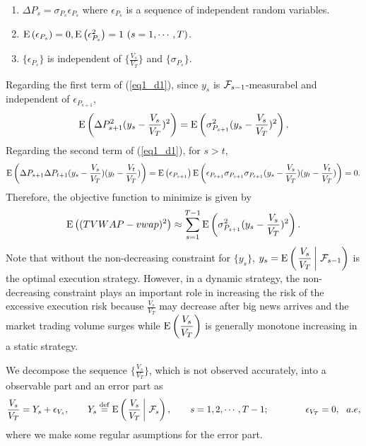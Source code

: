 \begin{assumption}\label{ass_d1}

\quad \\
\vspace*{-7mm}

\begin{enumerate}
\item $\Delta P_s=\sigma_{P_s}\epsilon_{P_s}$ where $\epsilon_{P_s}$ is a 
sequence of independent random variables.
\item ${\mathrm{E}}\left( \epsilon_{P_s} \right)=0, {\mathrm{E}}\left( \epsilon_{P_s}^2 \right)=1 \ (s=1,\cdots,T)$.
\item $\{ \epsilon_{P_s} \}$ is independent of $\{\displaystyle  \frac{V_s}{V_T} 
\}$ and $\{ \sigma_{P_s} \}$.
\end{enumerate}
\end{assumption}
Regarding the first term of (\ref{eq1_d1}), since $y_s$ is
${\cal F}_{s-1}$-measurabel and independent of $\epsilon_{P_{s+1}}$,
\[ %
  \ex{\Delta P_{s+1}^2 (y_s-\frac{V_s}{V_T})^2} = \ex{\sigma_{P_{s+1}}^2 (y_s-
\frac{V_s}{V_T})^2}.
\] %
Regarding the second term of (\ref{eq1_d1}), for $s>t$,
\[ %
  \ex{\Delta P_{s+1} \Delta P_{t+1} (y_s-\frac{V_s}{V_T}) (y_t-\frac{V_t}{V_T})}
   = \ex{\epsilon_{P_{s+1}}} \ex{\epsilon_{P_{t+1}} \sigma_{P_{s+1}} 
\sigma_{P_{t+1}} (y_s-\frac{V_s}{V_T}) (y_t-\frac{V_t}{V_T})} = 0.
\] %
Therefore, the objective function to minimize is given by
\begin{equation}\label{eq1_d2}
  {\mathrm{E}}\left( (TVWAP-vwap)^2 \right) \approx \sum_{s=1}^{T-1} {\mathrm{E}}\left( \sigma_{P_{s+1}}^2 (y_s-
\frac{V_s}{V_T})^2 \right).
\end{equation}
Note that without the non-decreasing constraint for $\{ y_s \}$, $\displaystyle 
y_s = {\mathrm{E}}\left( \left. \frac{V_s}{V_T} \, \right| \, {\cal F}_{s-1} \right)$ is the optimal execution strategy.  
However, in a dynamic strategy, the non-decreasing constraint plays an important 
role in increasing the risk of the excessive execution risk because $\displaystyle \frac{V_s}{V_T}$ may decrease after big news arrives 
and the market trading volume surges while $\displaystyle {\mathrm{E}}\left( \frac{V_s}{V_T} \right)$ 
is generally monotone increasing in a static strategy.

We decompose the sequence $\displaystyle \{ \frac{V_s}{V_T} \}$, which is not 
observed accurately, into a observable part and an error part as
\[ %
  \frac{V_s}{V_T} = Y_s + \epsilon_{V_s}, \qquad Y_s \define 
\cex{\frac{V_s}{V_T}}{\calF_s},
  \qquad s=1,2,\cdots,T-1; \qquad\qquad \epsilon_{V_T} = 0, \ \ a.e,
\] %
where we make some regular asumptions for the error part.

